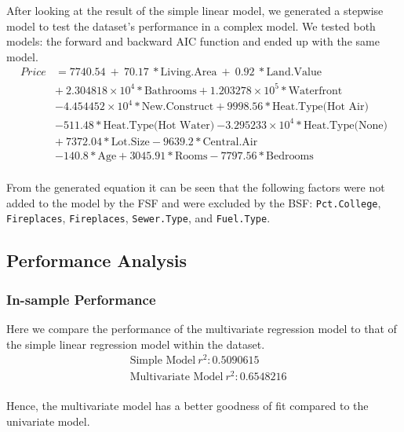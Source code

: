 \documentclass[letterpaper,9pt,twocolumn,twoside,]{pinp}
\begin{document}
After looking at the result of the simple linear model, we generated a
stepwise model to test the dataset's performance in a complex model. We
tested both models: the forward and backward AIC function and ended up
with the same model. \begin{equation}
  \begin{aligned}
Price&=7740.54\ +\ 70.17\ * \text{Living.Area}\ +\ 0.92\ * \text{Land.Value} \\
&+\ \ensuremath{2.304818\times 10^{4}} * \text{Bathrooms} + \ensuremath{1.203278\times 10^{5}} * \text{Waterfront}\   \\
& \ensuremath{-4.454452\times 10^{4}} * \text{New.Construct} + 9998.56 * \text{Heat.Type(Hot Air)}\ \\
& -511.48 * \text{Heat.Type(Hot Water)}\ \ensuremath{-3.295233\times 10^{4}} * \text{Heat.Type(None)}\\
&+\ 7372.04 * \text{Lot.Size} - 9639.2 * \text{Central.Air}\\
& -140.8 * \text{Age} + 3045.91 * \text{Rooms}  -7797.56 * \text{Bedrooms}\\
       \label{eqn:example}
  \end{aligned}
\end{equation}

From the generated equation it can be seen that the following factors
were not added to the model by the FSF and were excluded by the BSF:
\texttt{Pct.College}, \texttt{Fireplaces}, \texttt{Fireplaces},
\texttt{Sewer.Type}, and \texttt{Fuel.Type}.

\hypertarget{performance-analysis}{%
\subsection{Performance Analysis}\label{performance-analysis}}

\hypertarget{in-sample-performance}{%
\subsubsection{In-sample Performance}\label{in-sample-performance}}

Here we compare the performance of the multivariate regression model to
that of the simple linear regression model within the dataset.
\begin{equation}
  \begin{aligned}
&\text{Simple Model}\ r^2: 0.5090615\\
&\text{Multivariate Model}\ r^2: 0.6548216
       \label{eqn:example}
  \end{aligned}
\end{equation}\\
Hence, the multivariate model has a better goodness of fit compared to
the univariate model.
\end{document}
